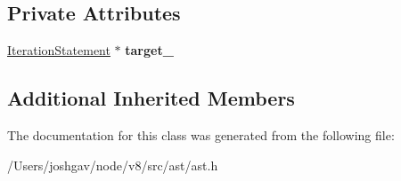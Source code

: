 \subsection*{Private Attributes}
\begin{DoxyCompactItemize}
\item 
\hyperlink{classv8_1_1internal_1_1_iteration_statement}{Iteration\+Statement} $\ast$ {\bfseries target\+\_\+}\hypertarget{classv8_1_1internal_1_1_continue_statement_a3bf748a4b7638f06f989615b09102a4f}{}\label{classv8_1_1internal_1_1_continue_statement_a3bf748a4b7638f06f989615b09102a4f}

\end{DoxyCompactItemize}
\subsection*{Additional Inherited Members}


The documentation for this class was generated from the following file\+:\begin{DoxyCompactItemize}
\item 
/\+Users/joshgav/node/v8/src/ast/ast.\+h\end{DoxyCompactItemize}
